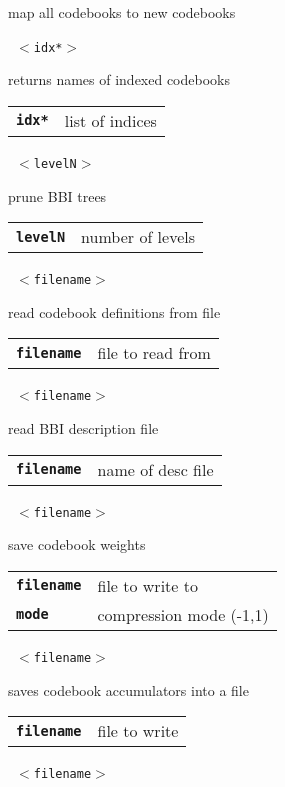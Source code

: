 \begin{description}
\begin{description}
        map all codebooks to new codebooks

       \texttt{ $<$idx*$>$} \

        returns names of indexed codebooks

      \begin{tabular}{ll}
 \texttt{\textbf{idx*}} & list of indices \\
      \end{tabular}
       \texttt{ $<$levelN$>$} \

        prune BBI trees

      \begin{tabular}{ll}
 \texttt{\textbf{levelN}} &  number of levels  \\
      \end{tabular}
       \texttt{ $<$filename$>$} \

        read codebook definitions from file

      \begin{tabular}{ll}
 \texttt{\textbf{filename}} &  file to read from  \\
      \end{tabular}
       \texttt{ $<$filename$>$} \

        read BBI description file

      \begin{tabular}{ll}
 \texttt{\textbf{filename}} &  name of desc file  \\
      \end{tabular}
       \texttt{ $<$filename$>$ } \

        save codebook weights

      \begin{tabular}{ll}
 \texttt{\textbf{filename}} &  file to write to  \\
 \texttt{\textbf{mode}} &       compression mode (-1,1)  \\
      \end{tabular}
       \texttt{ $<$filename$>$} \

        saves codebook accumulators into a file

      \begin{tabular}{ll}
 \texttt{\textbf{filename}} &  file to write  \\
      \end{tabular}
       \texttt{ $<$filename$>$} \


\end{description}
\end{description}
